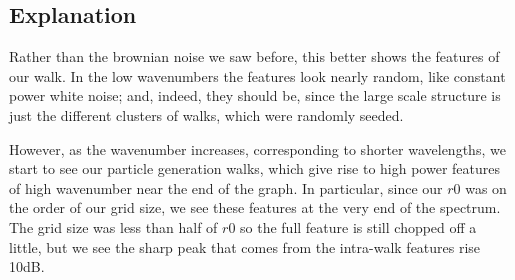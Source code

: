 \documentclass{article}
\begin{document}
\subsection{Explanation}

Rather than the brownian noise we saw before, this better shows the features of our walk. In the low wavenumbers the features look nearly random, like constant power white noise; and, indeed, they should be, since the large scale structure is just the different clusters of walks, which were randomly seeded.

However, as the wavenumber increases, corresponding to shorter wavelengths, we start to see our particle generation walks, which give rise to high power features of high wavenumber near the end of the graph. In particular, since our $r0$ was on the order of our grid size, we see these features at the very end of the spectrum. The grid size was less than half of $r0$ so the full feature is still chopped off a little, but we see the sharp peak that comes from the intra-walk features rise 10dB.
\end{document}
